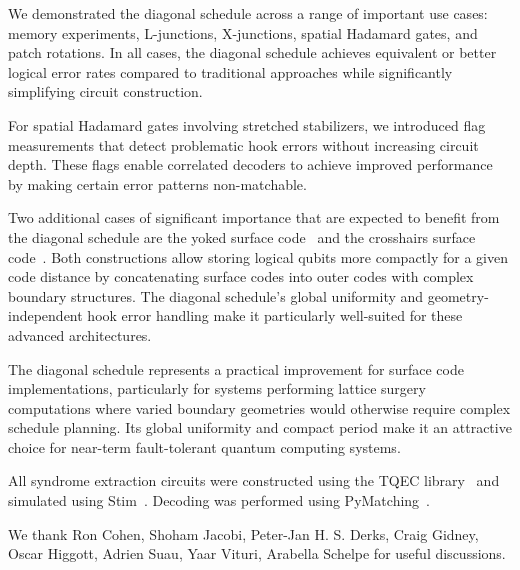 \documentclass[twocolumn,
aps,
prx,
showpacs,
amsmath,
amssymb,
floatfix,
longbibliography,
superscriptaddress,
eprint]
{revtex4-1}
\begin{document}
We demonstrated the diagonal schedule across a range of important use cases: memory experiments, L-junctions, X-junctions, spatial Hadamard gates, and patch rotations.
In all cases, the diagonal schedule achieves equivalent or better logical error rates compared to traditional approaches while significantly simplifying circuit construction.

For spatial Hadamard gates involving stretched stabilizers, we introduced flag measurements that detect problematic hook errors without increasing circuit depth.
These flags enable correlated decoders to achieve improved performance by making certain error patterns non-matchable.

Two additional cases of significant importance that are expected to benefit from the diagonal schedule are the yoked surface code~\cite{gidney2025yoked} and the crosshairs surface code~\cite{litinski2025crosshairs}.
Both constructions allow storing logical qubits more compactly for a given code distance by concatenating surface codes into outer codes with complex boundary structures.
The diagonal schedule's global uniformity and geometry-independent hook error handling make it particularly well-suited for these advanced architectures.

The diagonal schedule represents a practical improvement for surface code implementations, particularly for systems performing lattice surgery computations where varied boundary geometries would otherwise require complex schedule planning.
Its global uniformity and compact period make it an attractive choice for near-term fault-tolerant quantum computing systems.

All syndrome extraction circuits were constructed using the TQEC library~\cite{tqec2024} and simulated using Stim~\cite{gidney2021stim}.
Decoding was performed using PyMatching~\cite{higgott2023pymatching}.

\acknowledgments

We thank Ron Cohen, Shoham Jacobi, Peter-Jan H. S. Derks, Craig Gidney, Oscar Higgott, Adrien Suau, Yaar Vituri, Arabella Schelpe    for useful discussions.


\end{document}
